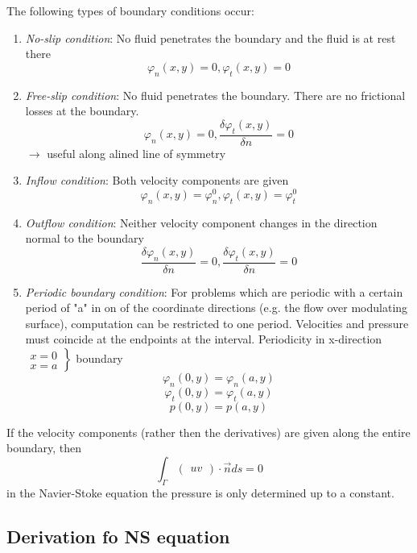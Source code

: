 The following types of boundary conditions occur:
\begin{enumerate}
	\item \textit{No-slip condition}: No fluid penetrates the boundary and the fluid is at rest there
	\[ \varphi_n(x,y) = 0, \varphi_t(x,y)=0\]
	\item \textit{Free-slip condition}: No fluid penetrates the boundary. There are no frictional losses at the boundary.
	\[ \varphi_n (x,y)= 0, \frac{\delta \varphi_t(x,y)}{\delta n} = 0 \]
	$\rightarrow$ useful along alined line of symmetry
	\item \textit{Inflow condition}: Both velocity components are given
	\[ \varphi_n(x,y) = \varphi_n^0, \varphi_t(x,y) = \varphi_t^0\]
	\item \textit{Outflow condition}: Neither velocity component changes in the direction normal to the boundary
	\[ \frac{\delta \varphi_n(x,y)}{\delta n} = 0, \frac{\delta \varphi_t(x,y)}{\delta n} = 0\]
	\item \textit{Periodic boundary condition}: For problems which are periodic with a certain period of "a" in on of the coordinate directions (e.g. the flow over modulating surface), computation can be restricted to one period. Velocities and pressure must coincide at the endpoints at the interval. Periodicity in x-direction $\left.\begin{matrix}
	x = 0\\
	x=a
	\end{matrix}\right\rbrace$ boundary
	\[\varphi_n (0, y) = \varphi_n(a,y)\]
	\[ \varphi_t(0,y) = \varphi_t(a,y)\]
	\[ p (0, y) = p(a,y)\]
	
\end{enumerate}

If the velocity components (rather then the derivatives) are given along the entire boundary, then
\[ \int_\Gamma \begin{pmatrix}
u
v
\end{pmatrix} \cdot \vec{n} ds = 0\]
in the Navier-Stoke equation the pressure is only determined up to a constant.

\subsection{Derivation fo NS equation} %

